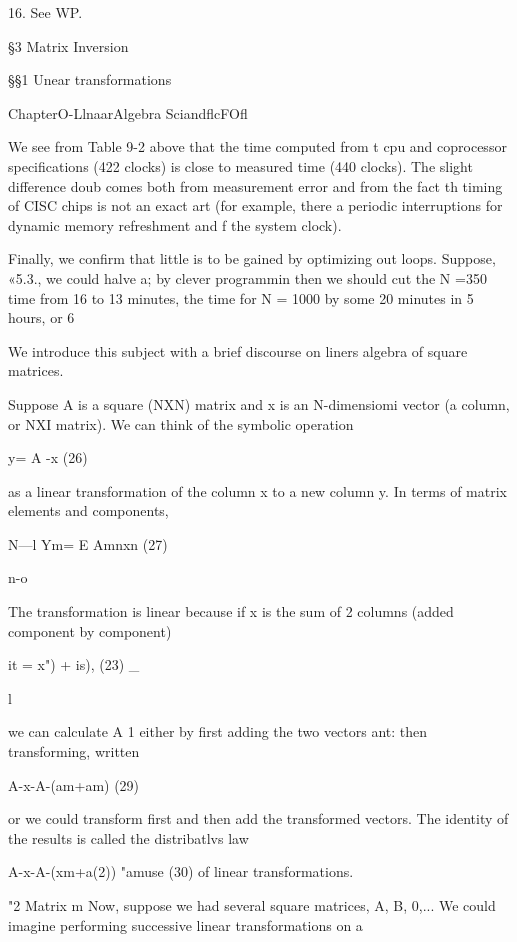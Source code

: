 {{{{{{{{16. See WP.



\S3 Matrix Inversion

\S\S1 Unear transformations

  
 
    
   
   
  

ChapterO-LlnaarAlgebra SciandflcFOfl

We see from Table 9-2 above that the time computed from t
cpu and coprocessor speciﬁcations (422 clocks) is close to
measured time (440 clocks). The slight difference doub
comes both from measurement error and from the fact th
timing of CISC chips is not an exact art (for example, there a
periodic interruptions for dynamic memory refreshment and f
the system clock).

Finally, we conﬁrm that little is to be gained by optimizing out
loops. Suppose, «5.3., we could halve a; by clever programmin
then we should cut the N =350 time from 16 to 13 minutes,
the time for N = 1000 by some 20 minutes in 5 hours, or 6%

We introduce this subject with a brief discourse on liners
algebra of square matrices.

Suppose A is a square (NXN) matrix and x is an N-dimensiomi
vector (a column, or NXI matrix). We can think of the symbolic
operation

y= A -x (26)

 

as a linear transformation of the column x to a new column y. In
terms of matrix elements and components,

N—l
Ym= E Amnxn (27)

n-o

The transformation is linear because if x is the sum of 2 columns
(added component by component)

it = x") + is), (23) \_

l

we can calculate A 1 either by ﬁrst adding the two vectors ant:
then transforming, written

A-x-A-(am+am) (29)

or we could transform ﬁrst and then add the transformed vectors.
The identity of the results is called the distribatlvs law

A-x-A-(xm+a(2)) "amuse (30)
of linear transformations.

"2 Matrix m
Now, suppose we had several square matrices, A, B, 0,... We
could imagine performing successive linear transformations on a

}}}}}}}}
